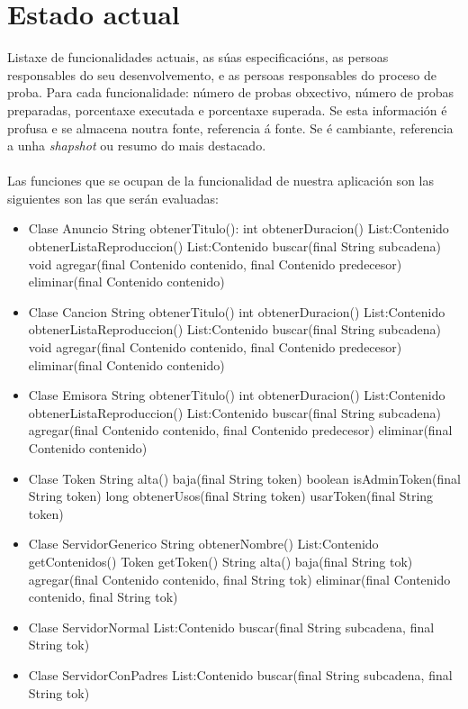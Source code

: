 \documentclass[12pt, a4paper, titlepage]{article}
\begin{document}
	
	\section{Estado actual}
	
	Listaxe de funcionalidades actuais, as súas especificacións, as persoas responsables do seu desenvolvemento, e as persoas responsables do proceso de proba.  Para cada funcionalidade: número de probas obxectivo, número de probas preparadas, porcentaxe executada e porcentaxe superada. Se esta información é profusa e se almacena noutra fonte, referencia á fonte. Se é cambiante, referencia a unha \emph{shapshot} ou resumo do mais destacado.\\ \\
	Las funciones que se ocupan de la funcionalidad de nuestra aplicación son las siguientes son las que serán evaluadas:
		\begin{itemize}
			\item Clase Anuncio
				\subitem String obtenerTitulo(): 
				\subitem int obtenerDuracion()
				\subitem List:Contenido obtenerListaReproduccion()
				\subitem List:Contenido buscar(final String subcadena)
				\subitem	void agregar(final Contenido contenido, final Contenido predecesor)
				\subitem	eliminar(final Contenido contenido)
			\item Clase Cancion
				\subitem String obtenerTitulo()
				\subitem int obtenerDuracion()
				\subitem List:Contenido obtenerListaReproduccion()
				\subitem List:Contenido buscar(final String subcadena)
				\subitem	void agregar(final Contenido contenido, final Contenido predecesor)
				\subitem	eliminar(final Contenido contenido)
			\item Clase Emisora
				\subitem String obtenerTitulo()
				\subitem int obtenerDuracion()
				\subitem List:Contenido obtenerListaReproduccion()
				\subitem List:Contenido buscar(final String subcadena)
				\subitem agregar(final Contenido contenido, final Contenido predecesor)
				\subitem eliminar(final Contenido contenido)
			\item Clase Token
				\subitem String alta()
				\subitem baja(final String token)
				\subitem boolean isAdminToken(final String token)
				\subitem long obtenerUsos(final String token)
				\subitem usarToken(final String token)
			\item Clase ServidorGenerico
				\subitem String obtenerNombre()
				\subitem List:Contenido getContenidos()
				\subitem Token getToken()
				\subitem String alta()
				\subitem baja(final String tok)
				\subitem agregar(final Contenido contenido, final String tok)
				\subitem eliminar(final Contenido contenido, final String tok)
			\item Clase ServidorNormal
				\subitem List:Contenido buscar(final String subcadena, final String tok)
			\item Clase ServidorConPadres
				\subitem List:Contenido buscar(final String subcadena, final String tok)
		\end{itemize}
	
\end{document}
